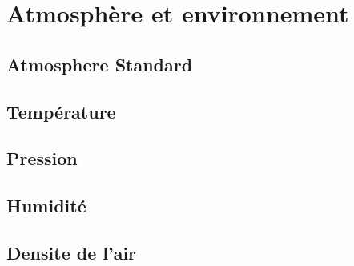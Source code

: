 
\chapter*{}

\cleardoublepage
{}
\renewcommand{\CurrentPartColor}{Part2Color}
\renewcommand{\CurrentPartNumber}{Partie 02}
\renewcommand{\CurrentPartName}{Atmosphère et environnement}
\renewcommand{\CurrentChapterType}{Chapitre}


\part{Atmosphère et environnement}

    \chapter{Atmosphere Standard}
    \label{chap:atmosphere_standard}
    

    \chapter{Température}
    \label{chap:temperature}
    

    \chapter{Pression}
    \label{chap:pression}
    

    \chapter{Humidité}
    \label{chap:humidite}
    

    \chapter{Densite de l'air}
    \label{chap:densite_air}
    

